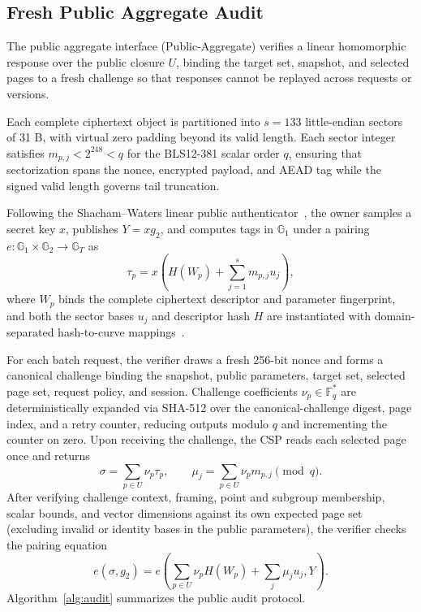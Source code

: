 \documentclass[10pt,journal]{IEEEtran}
\begin{document}
\subsection{Fresh Public Aggregate Audit}\label{sec:audit}
The public aggregate interface (Public-Aggregate) verifies a linear homomorphic response over the public closure $U$, binding the target set, snapshot, and selected pages to a fresh challenge so that responses cannot be replayed across requests or versions.

Each complete ciphertext object is partitioned into $s=133$ little-endian sectors of 31 B, with virtual zero padding beyond its valid length. Each sector integer satisfies $m_{p,j}<2^{248}<q$ for the BLS12-381 scalar order $q$, ensuring that sectorization spans the nonce, encrypted payload, and AEAD tag while the signed valid length governs tail truncation.

Following the Shacham--Waters linear public authenticator~\cite{ShachamWaters2013}, the owner samples a secret key $x$, publishes $Y=xg_2$, and computes tags in $\mathbb G_1$ under a pairing $e:\mathbb G_1\times\mathbb G_2\to\mathbb G_T$ as
\begin{equation}\label{eq:tag}
\tau_p=x\left(H(W_p)+\sum_{j=1}^{s}m_{p,j}u_j\right),
\end{equation}
where $W_p$ binds the complete ciphertext descriptor and parameter fingerprint, and both the sector bases $u_j$ and descriptor hash $H$ are instantiated with domain-separated hash-to-curve mappings~\cite{RFC9380}.

For each batch request, the verifier draws a fresh 256-bit nonce and forms a canonical challenge binding the snapshot, public parameters, target set, selected page set, request policy, and session. Challenge coefficients $\nu_p\in\mathbb F_q^*$ are deterministically expanded via SHA-512 over the canonical-challenge digest, page index, and a retry counter, reducing outputs modulo $q$ and incrementing the counter on zero. Upon receiving the challenge, the CSP reads each selected page once and returns
\begin{equation}\label{eq:aggregate}
\sigma=\sum_{p\in U}\nu_p\tau_p,\qquad
\mu_j=\sum_{p\in U}\nu_pm_{p,j}\pmod q.
\end{equation}
After verifying challenge context, framing, point and subgroup membership, scalar bounds, and vector dimensions against its own expected page set (excluding invalid or identity bases in the public parameters), the verifier checks the pairing equation
\begin{equation}\label{eq:pairing}
e(\sigma,g_2)=e\left(\sum_{p\in U}\nu_pH(W_p)+\sum_j\mu_ju_j,Y\right).
\end{equation}
Algorithm~\ref{alg:audit} summarizes the public audit protocol.
\end{document}
